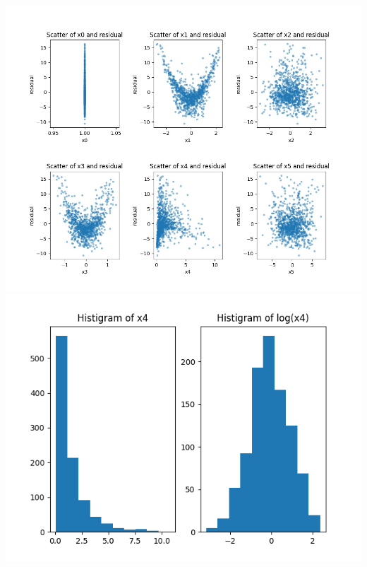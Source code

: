 \documentclass{article}
\begin{document}
\begin{center}
\includegraphics[width = 1\textwidth]{images/Scatter_cleaned.jpg}
\includegraphics[width = .6\textwidth]{images/hist.png}
\end{center}
\end{document}
